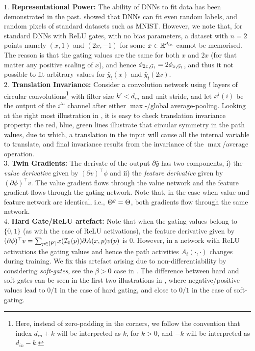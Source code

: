 $1.$ \textbf{Representational Power:} The ability of DNNs to fit data has been demonstrated in the past. \cite{ben} showed that DNNs can fit even random labels, and random pixels of standard datasets such as MNIST. However, we note that, for standard DNNs with ReLU gates, with no bias parameters, a dataset with $n=2$ points namely $(x,1)$ and $(2x,-1)$ for some $x\in \mathbb{R}^{d_{in}}$ cannot be memorised. The reason is that the gating values are the same for both $x$ and $2x$ (for that matter any positive scaling of $x$), and hence $\phi_{2x,\mathcal{G}_t }= 2\phi_{x,\mathcal{G}_t }$, and thus it not possible to fit arbitrary values for $\hat{y}_t(x)$ and $\hat{y}_t(2x)$.\\
$2.$ \textbf{Translation Invariance:} Consider a convolution network using $l$ layers of circular convolutions\footnote{Here, instead of zero-padding in the corners, we follow the convention that index $d_{in}+k$ will be interpreted as $k$, for $k>0$, and $-k$ will be interpreted as $d_{in}-k$.} with filter size $k'<d_{in}$ and unit stride, and let $x^l(i)$ be the output of the $i^{th}$ channel after either $\max$-/global average-pooling. Looking at the right most illustration in , it is easy to check translation invariance property: the red, blue, green lines illustrate that circular symmetry in the path values, due to which, a translation in the input will cause all the internal variable to translate, and final invariance results from the invariance of the $\max$/average operation.\\
$3.$ \textbf{Twin Gradients:} The derivate of the output $\partial \hat{y}$ has two components, i) the \emph{value derivative} given by $(\partial v)^\top \phi$ and ii) the \emph{feature derivative} given by $(\partial \phi)^\top v$. The value gradient flows through the value network and the feature gradient flows through the gating network. Note that, in the case when value and feature network are identical, i.e., ${\Theta}^g=\Theta$, both gradients flow through the same network. \\
$4.$ \textbf{Hard Gate/ReLU artefact:} Note that when the gating values belong to $\{0,1\}$ (as with the case of ReLU activations), the feature derivative given by $(\partial \phi)^\top v =\sum_{p\in[P]}x(\mathcal{I}_0(p))\partial A(x,p) v(p)$ is $0$. However, in a network with ReLU activations the gating values and hence the path activities $A_t(\cdot,\cdot)$ changes during training. We fix this artefact arising due to non-differentiability by considering \emph{soft-gates}, see the $\beta>0$ case in . The difference between hard and soft gates can be seen in the first two illustrations in , where negative/positive values lead to $0/1$ in the case of hard gating, and close to $0/1$ in the case of soft-gating.\\
